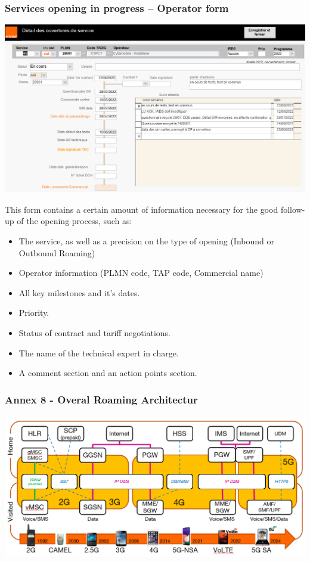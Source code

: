\subsubsection*{Services opening in progress – Operator form}
\begin{center}
\includegraphics[scale=0.6]{annexs/oliv 4.PNG}
\end{center}

This form contains a certain amount of information necessary for the good follow-up of
the opening process, such as:
\begin{itemize}
    \item The service, as well as a precision on the type of opening (Inbound or Outbound Roaming)
    \item Operator information (PLMN code, TAP code, Commercial name)
    \item All key milestones and it’s dates.
    \item Priority.
    \item Status of contract and tariff negotiations.
    \item The name of the technical expert in charge.
    \item A comment section and an action points section.
\end{itemize}

\subsubsection*{Annex 8 - Overal Roaming Architectur}
\begin{center}
\includegraphics[scale=0.71]{annexs/Overal Roaming services architecture.PNG}
\end{center}

